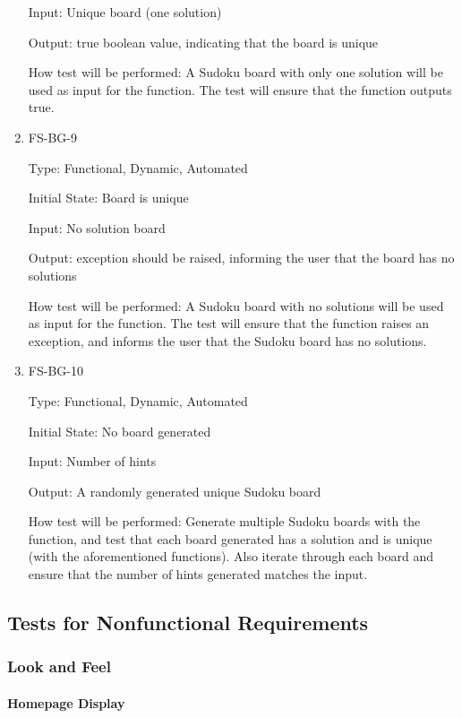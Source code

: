 \documentclass[11pt]{article}
\begin{document}
\begin{enumerate}
Input: Unique board (one solution)
					
Output: true boolean value, indicating that the board is unique
					
How test will be performed: A Sudoku board with only one solution will be used as input for the function. The test will ensure that the function outputs true.

\item{FS-BG-9\\}

Type: Functional, Dynamic, Automated
					
Initial State: Board is unique
					
Input: No solution board
					
Output: exception should be raised, informing the user that the board has no solutions
					
How test will be performed: A Sudoku board with no solutions will be used as input for the function. The test will ensure that the function raises an exception, and informs the user that the Sudoku board has no solutions.

\item{FS-BG-10\\}

Type: Functional, Dynamic, Automated
					
Initial State: No board generated
					
Input: Number of hints
					
Output: A randomly generated unique Sudoku board
					
How test will be performed: Generate multiple Sudoku boards with the function, and test that each board generated has a solution and is unique (with the aforementioned functions). Also iterate through each board and ensure that the number of hints generated matches the input. 

\end{enumerate}

\subsection{Tests for Nonfunctional Requirements}

\subsubsection{Look and Feel}
		
\paragraph{Homepage Display}
\end{document}
